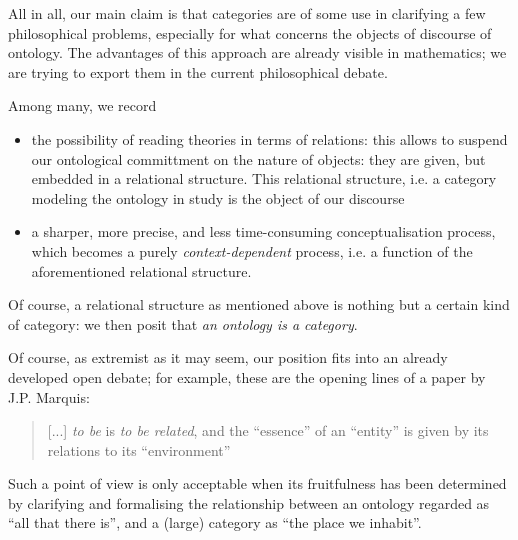 All in all, our main claim is that categories are of some use in clarifying a few philosophical problems, especially for what concerns the objects of discourse of ontology. The advantages of this approach are already visible in mathematics; we are trying to export them in the current philosophical debate. 

Among many, we record 
\begin{itemize}
	\item the possibility of reading theories in terms of relations: this allows to suspend our ontological committment on the nature of objects: they are given, but embedded in a relational structure. This relational structure, i.e. a category modeling the ontology in study is the object of our discourse
	\item a sharper, more precise, and less time-consuming conceptualisation process, which becomes a purely \emph{context-dependent} process, i.e. a function of the aforementioned relational structure.
\end{itemize}
Of course, a relational structure as mentioned above is nothing but a certain kind of category: we then posit that \emph{an ontology is a category}.

Of course, as extremist as it may seem, our position fits into an already developed open debate; for example, these are the opening lines of a paper by J.P. Marquis:
\begin{quote}
	[...] \emph{to be} is \emph{to be related}, and the ``essence'' of an ``entity'' is given by its relations to its ``environment''
	\hfill \cite{Marquis1997}
\end{quote}
Such a point of view is only acceptable when its fruitfulness has been determined by clarifying and formalising the relationship between an ontology regarded as ``all that there is'', and a (large) category as ``the place we inhabit''.

